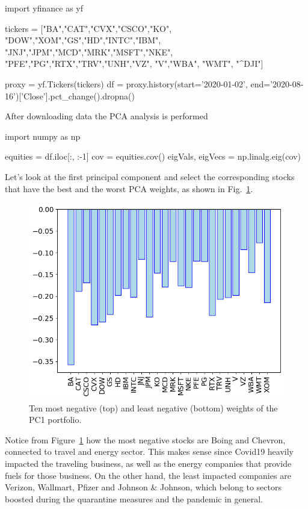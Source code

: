 \begin{ipython}
import yfinance as yf

tickers = ["BA","CAT","CVX","CSCO","KO",
	       "DOW","XOM","GS","HD","INTC","IBM",
	       "JNJ","JPM","MCD","MRK","MSFT","NKE",
	       "PFE","PG","RTX","TRV","UNH","VZ",
	       "V","WBA", "WMT", "^DJI"]
	
proxy = yf.Tickers(tickers)           
df = proxy.history(start='2020-01-02',
                   end='2020-08-16')['Close'].pct_change().dropna()
\end{ipython}

After downloading data the PCA analysis is performed
\begin{ipython}
import numpy as np
	
equities = df.iloc[:, :-1]
cov = equities.cov()
eigVals, eigVecs = np.linalg.eig(cov)
\end{ipython}

Let's look at the first principal component and select the corresponding stocks that have the best and the worst PCA weights, as shown in Fig.~\ref{fig:pca_covid_neg}.

\begin{figure}[htb]
\centering
\includegraphics[width=.6\textwidth]{figures/pc1_weights_covid}
\caption{Ten most negative (top) and least negative (bottom) weights of the PC1 portfolio.}
\label{fig:pca_covid_neg}
\end{figure}

Notice from Figure~\ref{fig:pca_covid_neg} how the most negative stocks are Boing and Chevron, connected to travel and energy sector. This makes sense since Covid19 heavily impacted the traveling business, as well as the energy companies that provide fuels for those business. On the other hand, the least impacted companies are Verizon, Wallmart, Pfizer and Johnson \& Johnson, which belong to sectors boosted during the quarantine measures and the pandemic in general.

